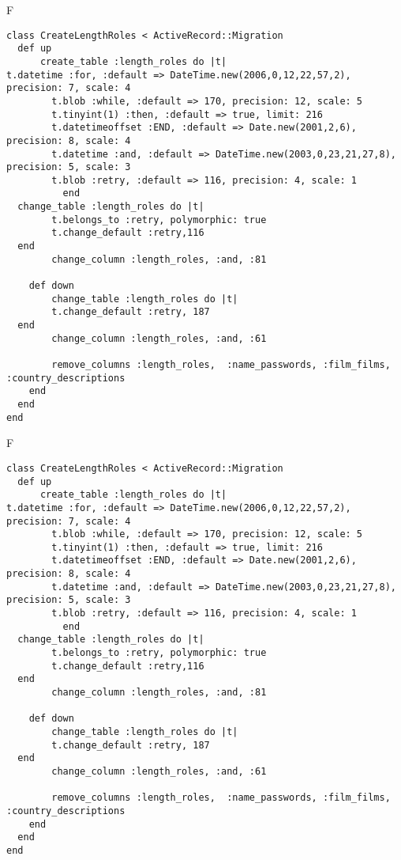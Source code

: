 F
\begin{verbatim}
class CreateLengthRoles < ActiveRecord::Migration
  def up
	  create_table :length_roles do |t|
t.datetime :for, :default => DateTime.new(2006,0,12,22,57,2), precision: 7, scale: 4
		t.blob :while, :default => 170, precision: 12, scale: 5
		t.tinyint(1) :then, :default => true, limit: 216
		t.datetimeoffset :END, :default => Date.new(2001,2,6), precision: 8, scale: 4
		t.datetime :and, :default => DateTime.new(2003,0,23,21,27,8), precision: 5, scale: 3
		t.blob :retry, :default => 116, precision: 4, scale: 1
		  end
  change_table :length_roles do |t|
		t.belongs_to :retry, polymorphic: true
 		t.change_default :retry,116
  end
 		change_column :length_roles, :and, :81
   
	def down
		change_table :length_roles do |t|
		t.change_default :retry, 187
  end
 		change_column :length_roles, :and, :61
   
		remove_columns :length_roles,  :name_passwords, :film_films, :country_descriptions 
    end 
  end
end

\end{verbatim}

F
\begin{verbatim}
class CreateLengthRoles < ActiveRecord::Migration
  def up
	  create_table :length_roles do |t|
t.datetime :for, :default => DateTime.new(2006,0,12,22,57,2), precision: 7, scale: 4
		t.blob :while, :default => 170, precision: 12, scale: 5
		t.tinyint(1) :then, :default => true, limit: 216
		t.datetimeoffset :END, :default => Date.new(2001,2,6), precision: 8, scale: 4
		t.datetime :and, :default => DateTime.new(2003,0,23,21,27,8), precision: 5, scale: 3
		t.blob :retry, :default => 116, precision: 4, scale: 1
		  end
  change_table :length_roles do |t|
		t.belongs_to :retry, polymorphic: true
 		t.change_default :retry,116
  end
 		change_column :length_roles, :and, :81
   
	def down
		change_table :length_roles do |t|
		t.change_default :retry, 187
  end
 		change_column :length_roles, :and, :61
   
		remove_columns :length_roles,  :name_passwords, :film_films, :country_descriptions 
    end 
  end
end

\end{verbatim}

